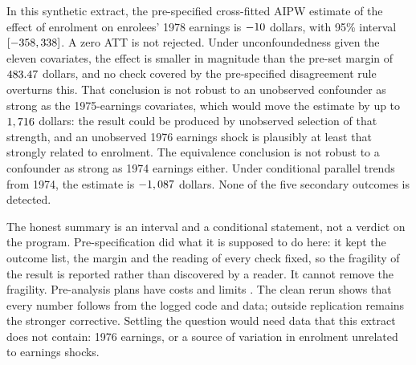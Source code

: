 \documentclass[11pt]{article}
\newcommand{\ci}[2]{$[#1, #2]$}
\begin{document}
In this synthetic extract, the pre-specified cross-fitted AIPW estimate of the effect of
enrolment on enrolees' 1978 earnings is $-10$ dollars, with 95\% interval
\ci{\PrimaryCILow}{\PrimaryCIHigh}. A zero ATT is not rejected. Under unconfoundedness
given the eleven covariates, the effect is smaller in magnitude than the pre-set margin of
$483.47$ dollars, and no check covered by the pre-specified disagreement rule
overturns this. That conclusion is
not robust to an unobserved confounder as strong as the 1975-earnings covariates, which would
move the estimate by up to $1,716$ dollars: the result could be
produced by unobserved selection of that strength, and an unobserved 1976 earnings shock is
plausibly at least that strongly related to enrolment. The equivalence conclusion is not
robust to a confounder as strong as 1974 earnings either. Under conditional parallel trends
from 1974, the estimate is $-1,087$ dollars. None of the five secondary
outcomes is detected.

The honest summary is an interval and a conditional statement, not a verdict on the
program. Pre-specification did what it is supposed to do here: it kept the outcome list, the
margin and the reading of every check fixed, so the fragility of the result is reported
rather than discovered by a reader. It cannot remove the fragility. Pre-analysis plans have
costs and limits \citep{olken2015,coffman2015}. The clean rerun shows that every number
follows from the logged code and data; outside replication remains the stronger corrective. Settling the question would need data
that this extract does not contain: 1976 earnings, or a source of variation in enrolment
unrelated to earnings shocks.





\end{document}
